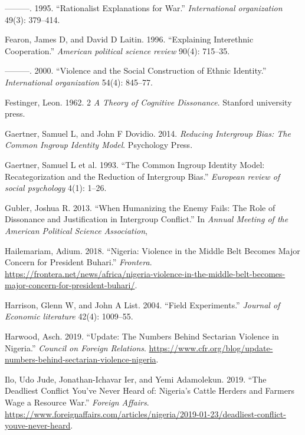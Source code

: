 \documentclass[11pt]{article}
\begin{document}
\leavevmode\hypertarget{ref-fearon1995rationalist}{}%
---------. 1995. ``Rationalist Explanations for War.''
\emph{International organization} 49(3): 379--414.

\leavevmode\hypertarget{ref-fearon1996explaining}{}%
Fearon, James D, and David D Laitin. 1996. ``Explaining Interethnic
Cooperation.'' \emph{American political science review} 90(4): 715--35.

\leavevmode\hypertarget{ref-fearon2000violence}{}%
---------. 2000. ``Violence and the Social Construction of Ethnic
Identity.'' \emph{International organization} 54(4): 845--77.

\leavevmode\hypertarget{ref-festinger1962cognitiveDissonance}{}%
Festinger, Leon. 1962. 2 \emph{A Theory of Cognitive Dissonance}.
Stanford university press.

\leavevmode\hypertarget{ref-gaertner2014reducing}{}%
Gaertner, Samuel L, and John F Dovidio. 2014. \emph{Reducing Intergroup
Bias: The Common Ingroup Identity Model}. Psychology Press.

\leavevmode\hypertarget{ref-gaertner1993common}{}%
Gaertner, Samuel L et al. 1993. ``The Common Ingroup Identity Model:
Recategorization and the Reduction of Intergroup Bias.'' \emph{European
review of social psychology} 4(1): 1--26.

\leavevmode\hypertarget{ref-gubler2013humanizing}{}%
Gubler, Joshua R. 2013. ``When Humanizing the Enemy Fails: The Role of
Dissonance and Justification in Intergroup Conflict.'' In \emph{Annual
Meeting of the American Political Science Association},

\leavevmode\hypertarget{ref-frontera2018nigeria}{}%
Hailemariam, Adium. 2018. ``Nigeria: Violence in the Middle Belt Becomes
Major Concern for President Buhari.'' \emph{Frontera}.
\url{https://frontera.net/news/africa/nigeria-violence-in-the-middle-belt-becomes-major-concern-for-president-buhari/}.

\leavevmode\hypertarget{ref-harrison2004field}{}%
Harrison, Glenn W, and John A List. 2004. ``Field Experiments.''
\emph{Journal of Economic literature} 42(4): 1009--55.

\leavevmode\hypertarget{ref-council2019nigeria}{}%
Harwood, Asch. 2019. ``Update: The Numbers Behind Sectarian Violence in
Nigeria.'' \emph{Council on Foreign Relations}.
\url{https://www.cfr.org/blog/update-numbers-behind-sectarian-violence-nigeria}.

\leavevmode\hypertarget{ref-fa2019deadly}{}%
Ilo, Udo Jude, Jonathan-Ichavar Ier, and Yemi Adamolekun. 2019. ``The
Deadliest Conflict You've Never Heard of: Nigeria's Cattle Herders and
Farmers Wage a Resource War.'' \emph{Foreign Affairs}.
\url{https://www.foreignaffairs.com/articles/nigeria/2019-01-23/deadliest-conflict-youve-never-heard}.
\end{document}
